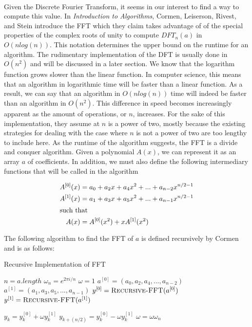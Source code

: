 \documentclass{amsproc}
\begin{document}
\mbox{}	 \\
\indent Given the Discrete Fourier Transform, it seems in our interest to find a way to compute this value. In \textit{Introduction to Algorithms}, Cormen, Leiserson, Rivest, and Stein introduce the FFT which they claim takes advantage of of the special properties of the complex roots of unity to compute $DFT_n(a)$ in $O(nlog(n))$. This notation determines the upper bound on the runtime for an algorithm. The rudimentary implementation of the DFT is usually done in $O(n^2)$ and will be discussed in a later section. We know that the logarithm function grows slower than the linear function. In computer science, this means that an algorithm in logarithmic time will be faster than a linear function. As a result, we can say that an algorithm in $O(nlog(n))$ time will indeed be faster than an algorithm in $O(n^2)$. This difference in speed becomes increasingly apparent as the amount of operations, or $n$, increases.  For the sake of this implementation, they assume at $n$ is a power of two, mostly because the existing strategies for dealing with the case where $n$ is not a power of two are too lengthy to include here. As the runtime of the algorithm suggests, the FFT is a divide and conquer algorithm. Given a polynomial $A(x)$, we can represent it as an array $a$ of coefficients. In addition, we must also define the following intermediary functions that will be called in the algorithm \cite{Cormen}
	
\begin{align*}
A^{[0]}(x) &= a_0 + a_2x + a_4x^2 + ... + a_{n-2}x^{n/2 - 1} \\
A^{[1]}(x) &= a_1 + a_3x + a_5x^2 + ... + a_{n-1}x^{n/2 - 1} \\
\intertext{such that}
A(x) &= A^{[0]}(x^2) + xA^{[1]}(x^2)
\end{align*}

The following algorithm to find the FFT of $a$ is defined recursively by Cormen and is as follows:

\begin{algorithm}
\caption{Recursive Implementation of FFT}\label{fft}
\begin{algorithmic}[1]
 
\State $n = a.length$
  
\EndIf
\State $\omega_n = e^{2\pi i / n}$ 
\State $\omega = 1$
\State $a^{[0]} = (a_0, a_2, a_4, ..., a_{n-2})$ 
\State $a^{[1]} = (a_1, a_3, a_5, ..., a_{n-1})$
\State $y^{[0]} = \Call{Recursive-FFT}{a^{[0]}}$ 
\State $y^{[1]} = \Call{Recursive-FFT}{a^{[1]}}$

	\State $y_k = y_k^{[0]} + \omega y_k^{[1]}$ 
	\State $y_{k+(n/2)} = y_k^{[0]} - \omega y_k^{[1]}$
	\State $\omega = \omega \omega_n$ 
\EndFor

\State {} 

\EndProcedure
\end{algorithmic}
\end{algorithm}
\end{document}
